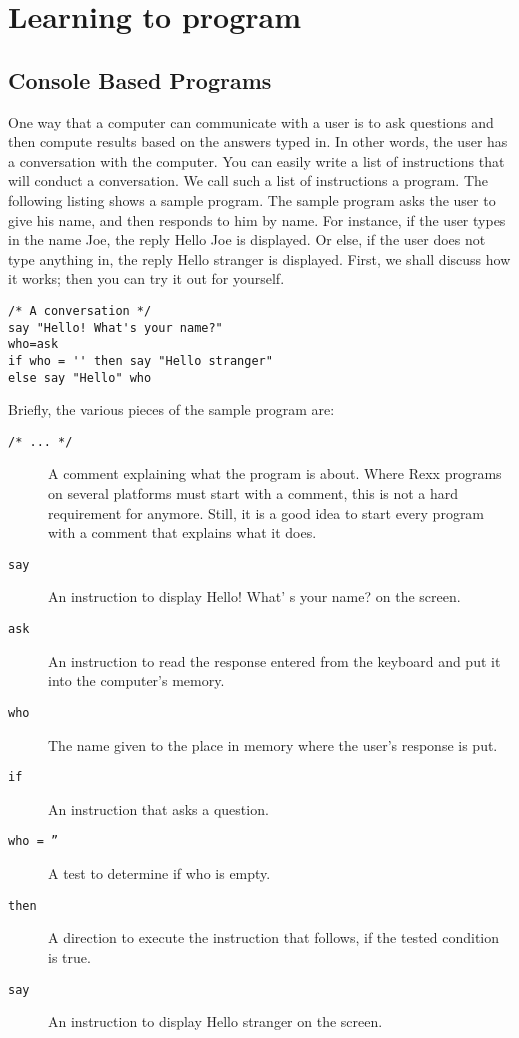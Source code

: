{\chapter{Learning to program}
\section{Console Based Programs}
One way that a computer can communicate with a user is to ask
questions and then compute results based on the answers typed in. In
other words, the user has a conversation with the computer. You can
easily write a list of  \nr{} instructions that will conduct a conversation. We call such a list of instructions a program.
The following listing shows a sample \nr{} program. The sample program asks the user to give his name, and then responds to him by name. For instance, if the user types in the name Joe, the reply Hello Joe is displayed. Or else, if the user does not type anything in, the reply Hello stranger is displayed.
First, we shall discuss how it works; then you can try it out for
yourself.
\begin{lstlisting}[label=hello,caption=Hello Stranger]
/* A conversation */
say "Hello! What's your name?"
who=ask
if who = '' then say "Hello stranger"
else say "Hello" who
\end{lstlisting}
Briefly, the various pieces of the sample program are:
\begin{description}
\item[\texttt{/* ... */}] A comment explaining what the program is
  about. Where Rexx programs on several platforms must start with a comment, this is not
  a hard requirement for \nr{} anymore. Still, it is a good idea to start
  every program with a comment that explains what it does.
\item [\texttt{say}] An instruction to display Hello! What' s your name? on the screen.
\item [\texttt{ask}] An instruction to read the response entered from the keyboard and put it into the computer's memory.
\item [\texttt{who}] The name given to the place in memory where the user's response is put.
\item [\texttt{if}] An instruction that asks a question. 
\item [\texttt{who = ''}] A test to determine if who is empty.
\item [\texttt{then}] A direction to execute the instruction that follows, if the tested condition is true.
\item [\texttt{say}] An instruction to display Hello stranger on the screen.

\end{description}}
